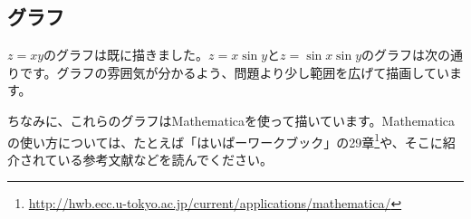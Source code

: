 \subsection{グラフ}
$z = xy$のグラフは既に描きました。$z = x \sin y$と$z = \sin x\sin y$のグラフは次の通りです。グラフの雰囲気が分かるよう、問題より少し範囲を広げて描画しています。
\begin{figure}[h!tbp]
\centering
{} \quad
{} \quad
\end{figure}

ちなみに、これらのグラフはMathematicaを使って描いています。Mathematicaの使い方については、たとえば「はいぱーワークブック」の29章\footnote{\url{http://hwb.ecc.u-tokyo.ac.jp/current/applications/mathematica/}}や、そこに紹介されている参考文献などを読んでください。

